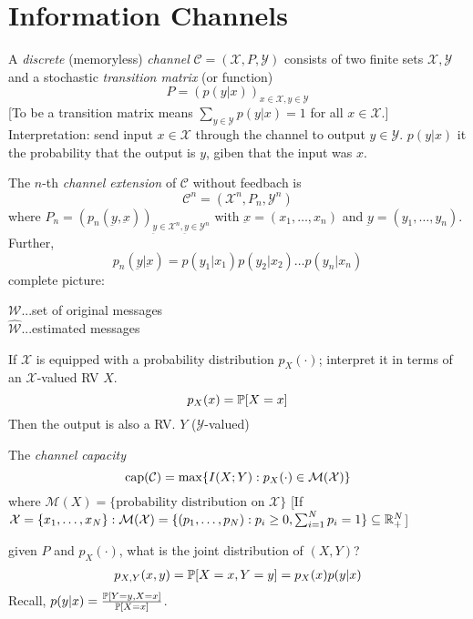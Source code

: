\documentclass[mfit.tex]{subfiles}
\begin{document}
\section{Information Channels}

\begin{defi*}
  A \emph{discrete} (memoryless) \emph{channel} $\mathcal{C} = (\mathcal{X}, P, \mathcal{Y})$ consists of two finite sets $\mathcal{X}, \mathcal{Y}$ and a stochastic \emph{transition matrix} (or function)
  \[ P = (p(y|x))_{x \in \mathcal{X},y \in \mathcal{Y}} \]
  [To be a transition matrix means $\sum_{y \in \mathcal{Y}} p(y|x) = 1$ for all $x \in \mathcal{X}$.]
  Interpretation: send input $x \in \mathcal{X}$ through the channel to output $y \in \mathcal{Y}$.
  $p(y|x)$ it the probability that the output is $y$, giben that the input was $x$.
\end{defi*}

\begin{defi*}
  The $n$-th \emph{channel extension} of $\mathcal{C}$ without feedbach is 
  \[ \mathcal{C}^n = (\mathcal{X}^n, P_n, \mathcal{Y}^n) \]
  where $P_n = (p_n(\underbar{y},\underbar{x}))_{\underbar{y} \in \mathcal{X}^n, \underbar{y} \in \mathcal{Y}^n}$
  with $\underbar{x} = (x_1,\dots,x_n)$ and $\underbar{y} = (y_1,\dots,y_n)$.
  Further,
  \[ p_n(\underbar{y}|\underbar{x}) = p(y_1|x_1) p(y_2|x_2) \dots p(y_n|x_n) \]
  complete picture:
  
  $\mathcal{W}$...set of original messages\\
  $\hat{\mathcal{W}}$...estimated messages
\end{defi*}

If $\mathcal{X}$ is equipped with a probability distribution $p_X(\cdot)$; interpret it in terms of an $\mathcal{X}$-valued RV $X$.
\[ p_X(x) = \operatorname{\mathbb{P}}[X=x] \]
Then the output is also a RV.
$Y$ ($\mathcal{Y}$-valued)

\begin{defi*}
  The \emph{channel capacity} 
  \[ \operatorname{cap}(\mathcal{C}) = \max\{I(X;Y): p_X(\cdot) \in \mathcal{M}(\mathcal{X})\} \]
  where $\mathcal{M}(X) = \{ \text{probability distribution on } \mathcal{X}\}$
  [If $\mathcal{X} = \{x_1,\dots,x_N\}: \mathcal{M}(\mathcal{X}) = \{(p_1,\dots,p_N): p_i \geq 0, \sum_{i=1}^N p_i = 1 \} \subseteq \mathbb{R}_+^N$]
\end{defi*}

given $P$ and $p_X(\cdot)$, what is the joint distribution of $(X,Y)$?
\begin{align*}
  p_{X,Y} (x,y) = \operatorname{\mathbb{P}}[X=x,Y=y] = p_X(x) p(y|x)
\end{align*}
Recall, $p(y|x) = \frac{\operatorname{\mathbb{P}}[Y=y,X=x]}{\operatorname{\mathbb{P}}[X=x]}$.
\end{document}
